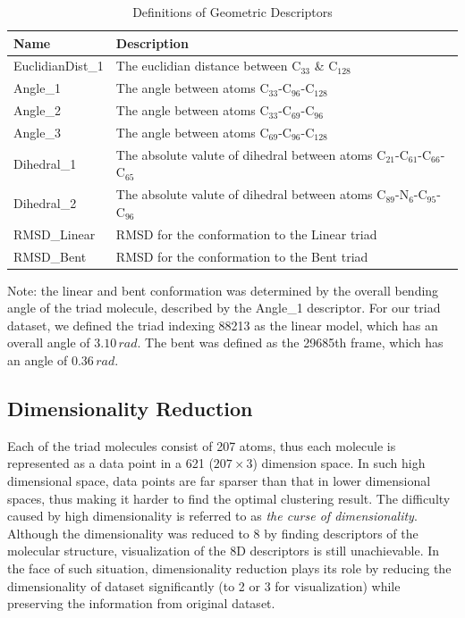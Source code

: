 \documentclass[a4paper]{article}
\begin{document}
\begin{table}[H]
    \centering
    \caption{Definitions of Geometric Descriptors}
    \begin{tabular}{l|l}
    \hline \hline
       \textbf{Name}  & \textbf{Description} \\
       \hline
       EuclidianDist\_1 & The euclidian distance between \(\text{C}_{33}\) \& \(\text{C}_{128}\) \\
       Angle\_1 & The angle between atoms \(\text{C}_{33}\)-\(\text{C}_{96}\)-\(\text{C}_{128}\) \\
       Angle\_2 & The angle between atoms \(\text{C}_{33}\)-\(\text{C}_{69}\)-\(\text{C}_{96}\) \\
       Angle\_3 & The angle between atoms \(\text{C}_{69}\)-\(\text{C}_{96}\)-\(\text{C}_{128}\) \\
       Dihedral\_1 & The absolute valute of dihedral between atoms \(\text{C}_{21}\)-\(\text{C}_{61}\)-\(\text{C}_{66}\)-\(\text{C}_{65}\) \\
       Dihedral\_2 & The absolute valute of dihedral between atoms \(\text{C}_{89}\)-\(\text{N}_{6}\)-\(\text{C}_{95}\)-\(\text{C}_{96}\) \\
       RMSD\_Linear & RMSD for the conformation to the Linear triad \\
       RMSD\_Bent & RMSD for the conformation to the Bent triad \\
       \hline \hline
    \end{tabular}
    
    \label{table: descriptors}
    \vspace{1ex}
    {\noindent \justifying Note: the linear and bent conformation was determined by the overall bending angle of the triad molecule, described by the Angle\_1 descriptor. For our triad dataset, we defined the triad indexing 88213 as the linear model, which has an overall angle of \(3.10\,rad\). The bent was defined as the 29685th frame, which has an angle of \(0.36\,rad\). \par}
\end{table}

\subsection{Dimensionality Reduction}
Each of the triad molecules consist of 207 atoms, thus each molecule is represented as a data point in a 621 (\(207 \times 3\)) dimension space. In such high dimensional space, data points are far sparser than that in lower dimensional spaces, thus making it harder to find the optimal clustering result. The difficulty caused by high dimensionality is referred to as \textit{the curse of dimensionality}\cite{GeronAurelien}. Although the dimensionality was reduced to 8 by finding descriptors of the molecular structure, visualization of the 8D descriptors is still unachievable. In the face of such situation, dimensionality reduction plays its role by reducing the dimensionality of dataset significantly (to 2 or 3 for visualization) while preserving the information from original dataset\cite{GlielmoAldo}.
\end{document}
